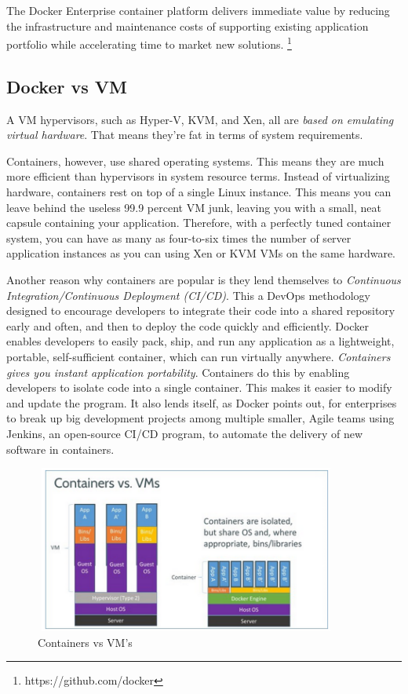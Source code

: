 \documentclass[a4paper]{article}
\begin{document}
The Docker Enterprise container platform delivers immediate value by reducing the infrastructure and maintenance costs of supporting existing application portfolio while accelerating time to market new solutions. \cite{docker} \footnote{https://github.com/docker}


\subsection{Docker vs VM}
A VM hypervisors, such as Hyper-V, KVM, and Xen, all are \textit{based on emulating virtual hardware}. That means they're fat in terms of system requirements.

Containers, however, use shared operating systems. This means they are much more efficient than hypervisors in system resource terms. Instead of virtualizing hardware, containers rest on top of a single Linux instance. This means you can leave behind the useless 99.9 percent VM junk, leaving you with a small, neat capsule containing your application. Therefore, with a perfectly tuned container system, you can have as many as four-to-six times the number of server application instances as you can using Xen or KVM VMs on the same hardware.

Another reason why containers are popular is they lend themselves to \textit{Continuous Integration/Continuous Deployment (CI/CD)}. This a DevOps methodology designed to encourage developers to integrate their code into a shared repository early and often, and then to deploy the code quickly and efficiently. Docker enables developers to easily pack, ship, and run any application as a lightweight, portable, self-sufficient container, which can run virtually anywhere. \textit{Containers gives you instant application portability}. Containers do this by enabling developers to isolate code into a single container. This makes it easier to modify and update the program. It also lends itself, as Docker points out, for enterprises to break up big development projects among multiple smaller, Agile teams using Jenkins, an open-source CI/CD program, to automate the delivery of new software in containers.


\begin{figure}
\centering
\includegraphics[width=10cm, height=5.5cm]{./images/docker-vm-container.png}
\caption{Containers vs VM's}
\end{figure}
\end{document}
